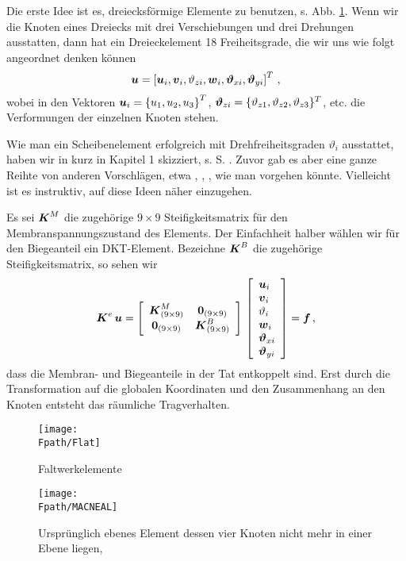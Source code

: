 Die erste Idee ist es, dreiecksf\"{o}rmige Elemente zu benutzen, s. Abb. \ref{Flat}. Wenn wir die Knoten eines Dreiecks mit drei Verschiebungen und drei Drehungen ausstatten, dann hat ein Dreieckelement 18 Freiheitsgrade, die wir uns wie folgt angeordnet denken k\"{o}nnen
\begin{align}
\vek u = \left[\vek u_i, \vek v_i, \vartheta_{zi}, \vek w_i, \vek \vartheta_{xi},\vek
\vartheta_{yi} \right]^T\,,
\end{align}
wobei in den Vektoren $\vek u_i = \left\{u_1, u_2, u_3\right\}^T$, $\vek
\vartheta_{zi} = \{ \vartheta_{z1}, \vartheta_{z2}, \vartheta_{z3} \}^T$, etc. die
Verformungen der einzelnen Knoten stehen.

Wie man ein Scheibenelement erfolgreich mit Drehfreiheitsgraden $\vartheta_i$ ausstattet, haben wir in kurz in Kapitel 1 skizziert, s. S. \pageref{Eq19}. Zuvor gab es aber eine ganze Reihte von anderen Vorschl\"{a}gen, etwa \cite{Allman}, \cite{Bergan},  \cite{Cook0}, wie man vorgehen k\"{o}nnte. Vielleicht ist es instruktiv, auf diese Ideen n\"{a}her einzugehen.

Es sei $\vek K^M$ die zugeh\"{o}rige $9 \times 9$ Steifigkeitsmatrix f\"{u}r den Membranspannungszustand des Elements. Der Einfachheit halber w\"{a}hlen wir f\"{u}r den Biegeanteil ein DKT-Element. Bezeichne $\vek K^B$ die zugeh\"{o}rige Steifigkeitsmatrix, so sehen wir
\begin{align}
\vek K^e\,\vek u = \left[ \barr {c c} \vek K^M_{(9 \times 9)} & \vek 0_{(9 \times 9)} \\
\vek 0_{(9 \times 9)} & \vek K^B_{(9 \times 9)} \earr \right]\, \left[\barr {l} \vek u_i
\\ \vek v_i \\ \vartheta_i \\ \vek w_i \\ \vek \vartheta_{xi} \\ \vek
\vartheta_{yi}\earr \right] = \vek f\,,
\end{align}
dass die Membran- und Biegeanteile in der Tat entkoppelt sind. Erst durch die Transformation auf die globalen Koordinaten und den Zusammenhang an den Knoten entsteht das r\"{a}umliche Tragverhalten.
\begin{figure}[tbp] \centering
\if {} \sidecaption \fi
\texttt{[image: \\Fpath/Flat]}
\caption{Faltwerkelemente}  \label{Flat}
\end{figure}%
\begin{figure}[tbp] \centering
\if {} \sidecaption \fi
\texttt{[image: \\Fpath/MACNEAL]}
\caption{Urspr\"{u}nglich ebenes Element dessen vier Knoten nicht mehr in einer Ebene
liegen, \protect \cite{MacNeal}}  \label{MacNeal}
\end{figure}%


